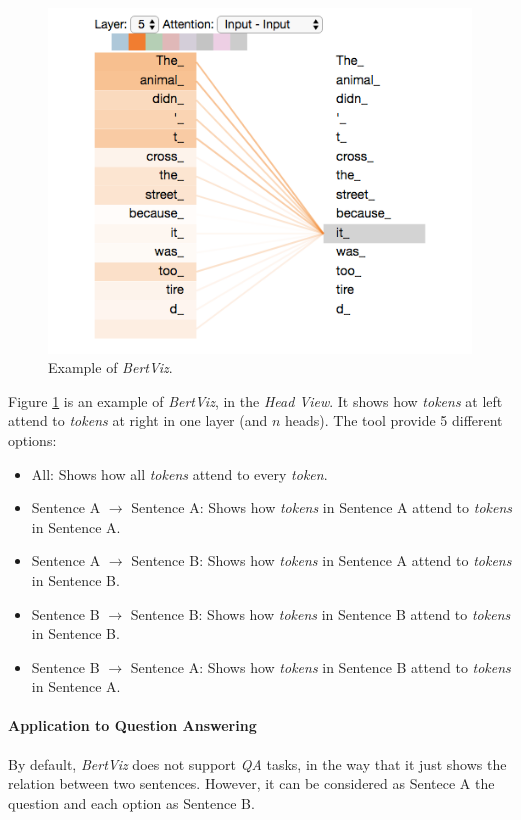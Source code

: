 \paragraph{}
\begin{figure}
	\centering
	\includegraphics[scale=0.55]{images/selfattention}
	\caption{Example of \emph{BertViz}.}
	\label{fig:bertviz-ex}
\end{figure}
Figure \ref{fig:bertviz-ex} is an example of \emph{BertViz}, in the \emph{Head View}. It shows how \emph{tokens} at left attend to \emph{tokens} at right in one layer (and $n$ heads). The tool provide 5 different options:
\begin{itemize}
	\item All: Shows how all \emph{tokens} attend to every \emph{token}.
	\item Sentence A $\rightarrow$ Sentence A: Shows how \emph{tokens} in Sentence A attend to \emph{tokens} in Sentence A.
	\item Sentence A $\rightarrow$ Sentence B: Shows how \emph{tokens} in Sentence A attend to \emph{tokens} in Sentence B.
	\item Sentence B $\rightarrow$ Sentence B: Shows how \emph{tokens} in Sentence B attend to \emph{tokens} in Sentence B.
	\item Sentence B $\rightarrow$ Sentence A: Shows how \emph{tokens} in Sentence B attend to \emph{tokens} in Sentence A.
\end{itemize}
\paragraph{Application to Question Answering}
By default, \emph{BertViz} does not support \emph{QA} tasks, in the way that it just shows the relation between two sentences. However, it can be considered as Sentece A the question and each option as Sentence B. 
